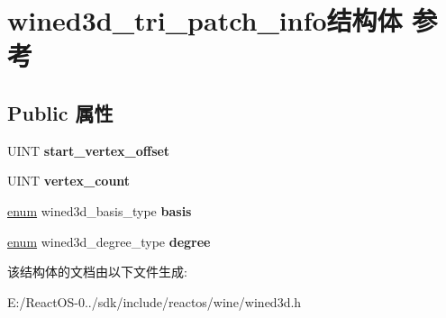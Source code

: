 \hypertarget{structwined3d__tri__patch__info}{}\section{wined3d\+\_\+tri\+\_\+patch\+\_\+info结构体 参考}
\label{structwined3d__tri__patch__info}
\subsection*{Public 属性}
\begin{DoxyCompactItemize}
\item 
\mbox{\label{structwined3d__tri__patch__info_a5a06d738cce4d65c831c79493ad9e6b1}} 
U\+I\+NT {\bfseries start\+\_\+vertex\+\_\+offset}
\item 
\mbox{\label{structwined3d__tri__patch__info_a4f7da60b947d230124ca85a50302d894}} 
U\+I\+NT {\bfseries vertex\+\_\+count}
\item 
\mbox{\label{structwined3d__tri__patch__info_a54b2ea7b96f08e1508e02bed1e8fe9a5}} 
\hyperlink{interfaceenum}{enum} wined3d\+\_\+basis\+\_\+type {\bfseries basis}
\item 
\mbox{\label{structwined3d__tri__patch__info_a1db5436685cd53577309b3f2ed982c6e}} 
\hyperlink{interfaceenum}{enum} wined3d\+\_\+degree\+\_\+type {\bfseries degree}
\end{DoxyCompactItemize}


该结构体的文档由以下文件生成\+:\begin{DoxyCompactItemize}
\item 
E\+:/\+React\+O\+S-\/0../sdk/include/reactos/wine/wined3d.\+h\end{DoxyCompactItemize}
